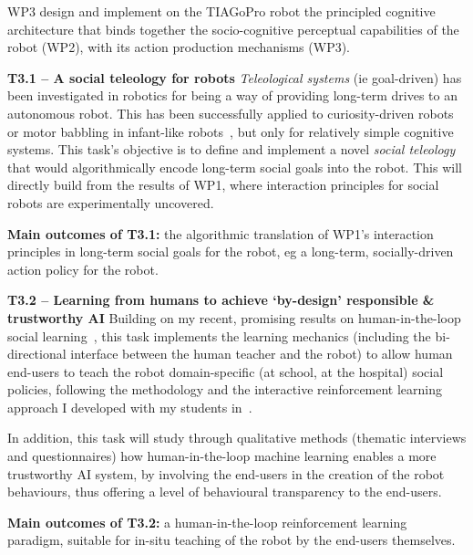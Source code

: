 \begin{rewrite}

WP3 design and implement on the TIAGoPro robot the principled cognitive architecture
that binds together the socio-cognitive perceptual capabilities of the robot
(WP2), with its action production mechanisms (WP3).

\textbf{T3.1 -- A social teleology for robots}
\emph{Teleological systems} (ie goal-driven) has been investigated in robotics
for being a way of providing long-term drives to an autonomous robot. This has
been successfully applied to curiosity-driven robots~\cite{oudeyer2005playground} or motor babbling in infant-like
robots~\cite{forestier2017unified}, but only for relatively simple cognitive
systems. This task's objective is to define and implement a novel \emph{social teleology} that would
algorithmically encode long-term social goals into the robot. This will directly
build from the results of WP1, where interaction principles for social robots
are experimentally uncovered.

\begin{framed}
    {\noindent\bf Main outcomes of T3.1:} the algorithmic translation of WP1's
    interaction principles in long-term social goals for the robot, eg a
    long-term, socially-driven action policy for the robot.
\end{framed}

\textbf{T3.2 -- Learning from humans to achieve `by-design' responsible \&
trustworthy AI}
Building on my recent, promising results on human-in-the-loop
social learning~\cite{senft2019teaching,winkle2020couch}, this task
implements the learning mechanics (including the bi-directional interface
between the human teacher and the robot) to allow human end-users to
teach the robot domain-specific (at school, at the hospital) social policies,
following the methodology and the interactive reinforcement learning approach I
developed with my students in~\cite{senft2017supervised}.

In addition, this task will study through qualitative methods (thematic
interviews and questionnaires) how human-in-the-loop machine learning enables a more
trustworthy AI system, by involving the end-users in the creation of the robot
behaviours, thus offering a level of behavioural transparency to the end-users.

\begin{framed}
    {\noindent\bf Main outcomes of T3.2:} a human-in-the-loop reinforcement
    learning paradigm, suitable for in-situ teaching of the robot by the
    end-users themselves.
\end{framed}

\end{rewrite}


